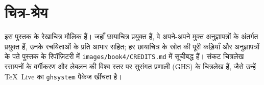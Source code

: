 \chapter*{चित्र-श्रेय}

इस पुस्तक के रेखाचित्र मौलिक हैं। जहाँ छायाचित्र प्रयुक्त हैं, वे अपने-अपने मुक्त
अनुज्ञापत्रों के अंतर्गत प्रयुक्त हैं, उनके रचयिताओं के प्रति आभार सहित; हर छायाचित्र के
स्रोत की पूरी कड़ियाँ और अनुज्ञापत्रों के पते पुस्तक के रिपॉज़िटरी में
\texttt{images/book4/CREDITS.md} में सूचीबद्ध हैं।
संकट चित्रलेख रसायनों के वर्गीकरण और लेबलन की विश्व स्तर पर सुसंगत प्रणाली (GHS) के
चित्रलेख हैं, जैसे उन्हें \TeX\ Live का \texttt{ghsystem} पैकेज खींचता है।

